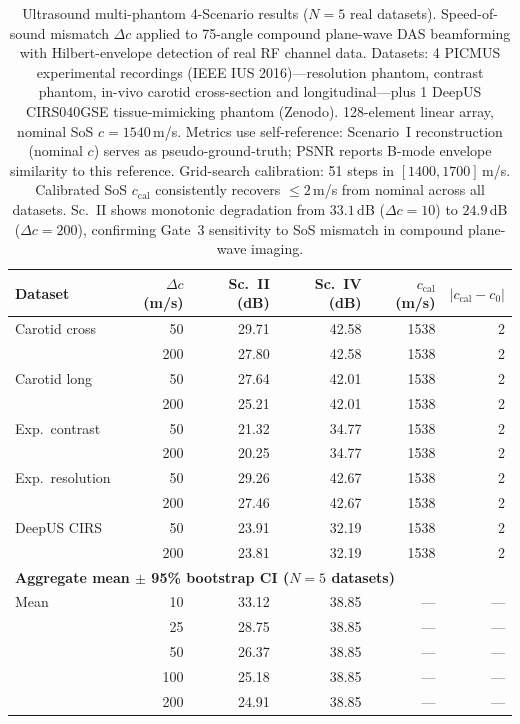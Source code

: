 \documentclass[11pt]{article}
\theoremstyle{definition}
\begin{document}
\begin{table}[htbp]
\centering
\caption{Ultrasound multi-phantom 4-Scenario results ($N{=}5$ real datasets). Speed-of-sound mismatch $\Delta c$ applied to 75-angle compound plane-wave DAS beamforming with Hilbert-envelope detection of real RF channel data.
Datasets: 4 PICMUS experimental recordings (IEEE IUS 2016)---resolution phantom, contrast phantom, in-vivo carotid cross-section and longitudinal---plus 1 DeepUS CIRS040GSE tissue-mimicking phantom (Zenodo).
128-element linear array, nominal SoS $c{=}1540$\,m/s.
Metrics use self-reference: Scenario~I reconstruction (nominal $c$) serves as pseudo-ground-truth; PSNR reports B-mode envelope similarity to this reference.
Grid-search calibration: 51 steps in $[1400, 1700]$\,m/s. Calibrated SoS $c_{\mathrm{cal}}$ consistently recovers $\leq 2$\,m/s from nominal across all datasets.
Sc.~II shows monotonic degradation from $33.1$\,dB ($\Delta c{=}10$) to $24.9$\,dB ($\Delta c{=}200$), confirming Gate~3 sensitivity to SoS mismatch in compound plane-wave imaging.}
\label{tab:us_scenes}
\small
\begin{tabular}{l r r r r r}
\toprule
Dataset & $\Delta c$ (m/s) & Sc.~II (dB) & Sc.~IV (dB) & $c_{\mathrm{cal}}$ (m/s) & $|c_{\mathrm{cal}} - c_0|$ \\
\midrule
Carotid cross   &  50 & 29.71 & 42.58 & 1538 & 2 \\
                & 200 & 27.80 & 42.58 & 1538 & 2 \\
Carotid long    &  50 & 27.64 & 42.01 & 1538 & 2 \\
                & 200 & 25.21 & 42.01 & 1538 & 2 \\
Exp.\ contrast  &  50 & 21.32 & 34.77 & 1538 & 2 \\
                & 200 & 20.25 & 34.77 & 1538 & 2 \\
Exp.\ resolution &  50 & 29.26 & 42.67 & 1538 & 2 \\
                 & 200 & 27.46 & 42.67 & 1538 & 2 \\
DeepUS CIRS     &  50 & 23.91 & 32.19 & 1538 & 2 \\
                & 200 & 23.81 & 32.19 & 1538 & 2 \\
\midrule
\multicolumn{6}{l}{\textbf{Aggregate mean $\pm$ 95\% bootstrap CI ($N{=}5$ datasets)}} \\
\midrule
Mean   &  10 & 33.12 & 38.85 & --- & --- \\
       &  25 & 28.75 & 38.85 & --- & --- \\
       &  50 & 26.37 & 38.85 & --- & --- \\
       & 100 & 25.18 & 38.85 & --- & --- \\
       & 200 & 24.91 & 38.85 & --- & --- \\
\bottomrule
\end{tabular}
\end{table}
\end{document}
